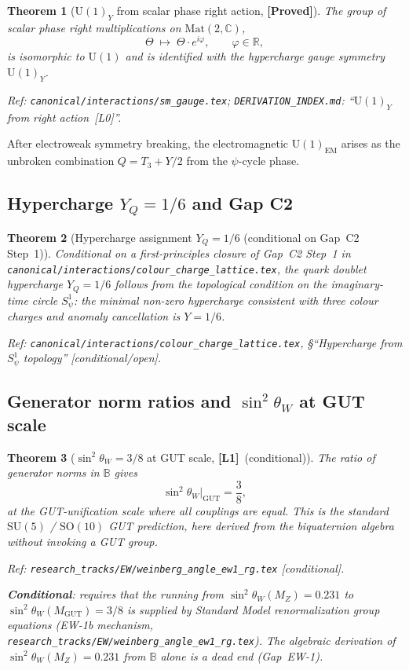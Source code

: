 \documentclass[12pt,a4paper]{article}
\newtheorem{theorem}{Theorem}[section]
\theoremstyle{definition}
\theoremstyle{remark}
\newcommand{\PROVED}{\textbf{[Proved]}}
\newcommand{\UU}[1]{\mathrm{U}(#1)}
\newcommand{\Lone}{\textbf{[L1]}}
\begin{document}
\begin{theorem}[$\UU{1}_Y$ from scalar phase right action, \PROVED]
\label{thm:u1}
The group of scalar phase right multiplications on $\mathrm{Mat}(2,\mathbb{C})$,
\[
  \Theta \;\mapsto\; \Theta\cdot e^{i\varphi}, \qquad \varphi\in\mathbb{R},
\]
is isomorphic to $\UU{1}$ and is identified with the hypercharge gauge
symmetry $\UU{1}_Y$.

Ref: \texttt{canonical/interactions/sm\_gauge.tex};
\texttt{DERIVATION\_INDEX.md}: ``$\UU{1}_Y$ from right action~[L0]''.
\end{theorem}

After electroweak symmetry breaking, the electromagnetic $\UU{1}_{\mathrm{EM}}$
arises as the unbroken combination $Q = T_3 + Y/2$ from the $\psi$-cycle phase.

\subsection{Hypercharge $Y_Q = 1/6$ and Gap C2}

\begin{theorem}[Hypercharge assignment $Y_Q = 1/6$ (conditional on Gap~C2 Step~1)]
\label{thm:hypercharge}
Conditional on a first-principles closure of Gap~C2 Step~1 in
\texttt{canonical/interactions/colour\_charge\_lattice.tex},
the quark doublet hypercharge $Y_Q = 1/6$ follows from the
topological condition on the imaginary-time circle $S^1_\psi$:
the minimal non-zero hypercharge consistent with three colour charges
and anomaly cancellation is $Y = 1/6$.

Ref: \texttt{canonical/interactions/colour\_charge\_lattice.tex},
\S ``Hypercharge from $S^1_\psi$ topology'' [conditional/open].
\end{theorem}

\subsection{Generator norm ratios and $\sin^2\theta_W$ at GUT scale}

\begin{theorem}[$\sin^2\theta_W = 3/8$ at GUT scale, \Lone\ (conditional)]
\label{thm:weinberg_gut}
The ratio of generator norms in $\mathbb{B}$ gives
\[
\sin^2\theta_W\big|_{\mathrm{GUT}} = \frac{3}{8},
\]
at the GUT-unification scale where all couplings are equal.
This is the standard $\mathrm{SU}(5)$ / $\mathrm{SO}(10)$ GUT prediction,
here derived from the biquaternion algebra without invoking a GUT group.

Ref: \texttt{research\_tracks/EW/weinberg\_angle\_ew1\_rg.tex} [conditional].

\textbf{Conditional}: requires that the running from $\sin^2\theta_W(M_Z) = 0.231$
to $\sin^2\theta_W(M_{\mathrm{GUT}}) = 3/8$ is supplied by Standard Model
renormalization group equations (EW-1b mechanism,
\texttt{research\_tracks/EW/weinberg\_angle\_ew1\_rg.tex}).
The algebraic derivation of $\sin^2\theta_W(M_Z) = 0.231$ from $\mathbb{B}$
alone is a dead end (Gap~EW-1).
\end{theorem}
\end{document}
